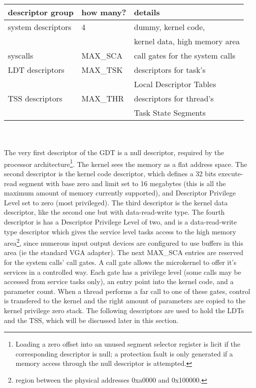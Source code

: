 \documentclass[11pt, letterpaper, twoside, english]{book}
\begin{document}
\begin{tabular}{|l|l|l|}
\hline
\textbf{descriptor group} & \textbf{how many?} & \textbf{details} \\
\hline
system descriptors & 4 & dummy, kernel code, \\
 & & kernel data, high memory area \\
\hline
syscalls & \textsf{MAX\_SCA} & call gates for the system calls \\
\hline
LDT descriptors & \textsf{MAX\_TSK} & descriptors for task's \\
 & & Local Descriptor Tables \\
\hline
TSS descriptors & \textsf{MAX\_THR} & descriptors for thread's \\
 & & Task State Segments \\
\hline 
\end{tabular}
\\
\\

The very first descriptor of the GDT is a null descriptor, required by the processor architecture\footnote{Loading a zero offset into an unused segment selector register is licit if the corresponding descriptor is null; a protection fault is only generated if a memory access through the null descriptor is attempted.}. The kernel sees the memory as a flat address space. The second descriptor is the kernel code descriptor, which defines a 32 bits execute-read segment with base zero and limit set to 16 megabytes (this is all the maximum amount of memory currently supported), and Descriptor Privilege Level set to zero (most privileged). The third descriptor is the kernel data descriptor, like the second one but with data-read-write type. The fourth descriptor is has a Descriptor Privilege Level of two, and is a data-read-write type descriptor which gives the service level tasks access to the high memory area\footnote{region between the physical addresses 0xa0000 and 0x100000.}, since numerous input output devices are configured to use buffers in this area (ie the standard VGA adapter). The next \textsf{MAX\_SCA} entries are reserved for the system calls' call gates. A call gate allows the microkernel to offer it's services in a controlled way. Each gate has a privilege level (some calls may be accessed from service tasks only), an entry point into the kernel code, and a parameter count. When a thread performs a far call to one of these gates, control is transfered to the kernel and the right amount of parameters are copied to the kernel privilege zero stack. The following descriptors are used to hold the LDTs and the TSS, which will be discussed later in this section. 
\end{document}
